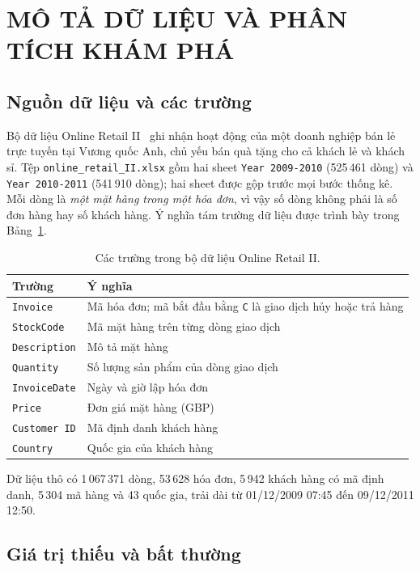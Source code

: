 \documentclass[../report.tex]{subfiles}
\begin{document}
\newpage
\section{MÔ TẢ DỮ LIỆU VÀ PHÂN TÍCH KHÁM PHÁ}
\label{sec:eda}

\subsection{Nguồn dữ liệu và các trường}

Bộ dữ liệu Online Retail II~\cite{chen2019dataset} ghi nhận hoạt động của một doanh nghiệp bán lẻ trực tuyến tại Vương quốc Anh, chủ yếu bán quà tặng cho cả khách lẻ và khách sỉ. Tệp \texttt{online\_retail\_II.xlsx} gồm hai sheet \texttt{Year 2009-2010} (525\,461 dòng) và \texttt{Year 2010-2011} (541\,910 dòng); hai sheet được gộp trước mọi bước thống kê. Mỗi dòng là \emph{một mặt hàng trong một hóa đơn}, vì vậy số dòng không phải là số đơn hàng hay số khách hàng. Ý nghĩa tám trường dữ liệu được trình bày trong Bảng~\ref{tab:fields}.

\begin{table}[H]
\centering
\small
\begin{tabularx}{\textwidth}{@{}l X@{}}
\toprule
\textbf{Trường} & \textbf{Ý nghĩa} \\
\midrule
\texttt{Invoice} & Mã hóa đơn; mã bắt đầu bằng \texttt{C} là giao dịch hủy hoặc trả hàng \\
\texttt{StockCode} & Mã mặt hàng trên từng dòng giao dịch \\
\texttt{Description} & Mô tả mặt hàng \\
\texttt{Quantity} & Số lượng sản phẩm của dòng giao dịch \\
\texttt{InvoiceDate} & Ngày và giờ lập hóa đơn \\
\texttt{Price} & Đơn giá mặt hàng (GBP) \\
\texttt{Customer ID} & Mã định danh khách hàng \\
\texttt{Country} & Quốc gia của khách hàng \\
\bottomrule
\end{tabularx}
\caption{Các trường trong bộ dữ liệu Online Retail II.}
\label{tab:fields}
\end{table}

Dữ liệu thô có 1\,067\,371 dòng, 53\,628 hóa đơn, 5\,942 khách hàng có mã định danh, 5\,304 mã hàng và 43 quốc gia, trải dài từ 01/12/2009 07:45 đến 09/12/2011 12:50.

\subsection{Giá trị thiếu và bất thường}
\end{document}
